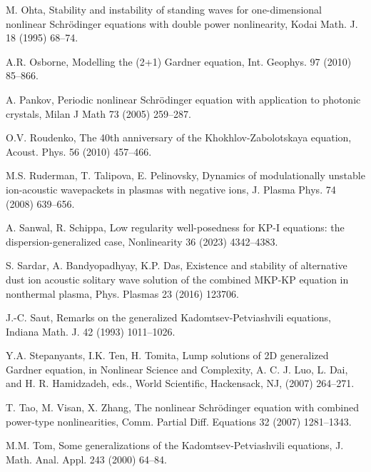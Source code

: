 \documentclass[10pt]{article}
\numberwithin{equation}{section}
\begin{document}
\begin{thebibliography}{00}
			
			
			M. Ohta,   Stability and instability of standing waves for one-dimensional nonlinear Schrödinger equations with double power nonlinearity, 
			Kodai Math. J. 18   (1995) 68--74.
			
			A.R. Osborne,  
			Modelling the (2+1) Gardner equation,
			Int. Geophys. 97  (2010) 85--866.
			
			A. Pankov,
			Periodic nonlinear Schr\"{o}dinger equation with application to photonic crystals, Milan J Math 73  (2005) 259--287.
			
			
			O.V. Roudenko, 
			The 40th anniversary of the Khokhlov-Zabolotskaya equation, 
			Acoust. Phys.  56 (2010)  457--466.
			
			
			M.S. Ruderman, T. Talipova, E. Pelinovsky, 
			Dynamics of modulationally unstable ion-acoustic wavepackets in plasmas with negative ions, 
			J. Plasma Phys. 74  (2008) 639--656.
			
			A. Sanwal, R. Schippa,
			Low regularity well-posedness for KP-I equations: the dispersion-generalized case,   Nonlinearity   36  (2023) 4342--4383.
			
			S. Sardar,  A. Bandyopadhyay,  K.P. Das,
			Existence and stability of alternative dust ion acoustic solitary wave solution of the combined MKP-KP equation in nonthermal plasma,
			Phys. Plasmas 23  (2016) 123706.
			
			J.-C. Saut,
			Remarks on the generalized Kadomtsev-Petviashvili equations, 
			{Indiana Math. J.} {42}  (1993)  1011--1026.
			
			
			
			Y.A. Stepanyants, I.K. Ten, H. Tomita,
			Lump solutions of 2D generalized Gardner equation,
			in Nonlinear Science and Complexity, A. C. J. Luo, L. Dai, and H. R.
			Hamidzadeh, eds., World Scientific, Hackensack, NJ, (2007) 264--271.
			
			
			T. Tao, M. Visan, X. Zhang, 
			The nonlinear Schr\"{o}dinger equation with combined power-type nonlinearities, 
			Comm. Partial Diff. Equations  32 (2007)  1281--1343.
			
			M.M. Tom,   
			Some generalizations of the Kadomtsev-Petviashvili equations,
			J. Math. Anal. Appl. 243 (2000)  64--84.
			

\end{thebibliography}
\end{document}
